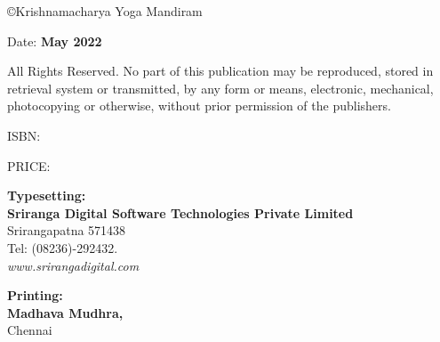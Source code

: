 \thispagestyle{empty}

{\small\copyright{Krishnamacharya Yoga Mandiram}}
\bigskip

Date: \textbf{May 2022}
\vfill

{\small
All Rights Reserved. No part of this publication may be reproduced, stored in retrieval system or 
transmitted, by any form or means, electronic, mechanical, photocopying or otherwise, without 
prior permission of the publishers.}
\vspace{1cm}

ISBN: 
\bigskip

PRICE:
\vfill

\textbf{Typesetting:}\\[4pt] 
\textbf{Sriranga Digital Software Technologies Private Limited}\\ 
Srirangapatna 571438\\ 
Tel: (08236)-292432.\\ 
\textit{www.srirangadigital.com}
\vfill

\textbf{Printing:}\\ 
\textbf{Madhava Mudhra,}\\ 
Chennai


